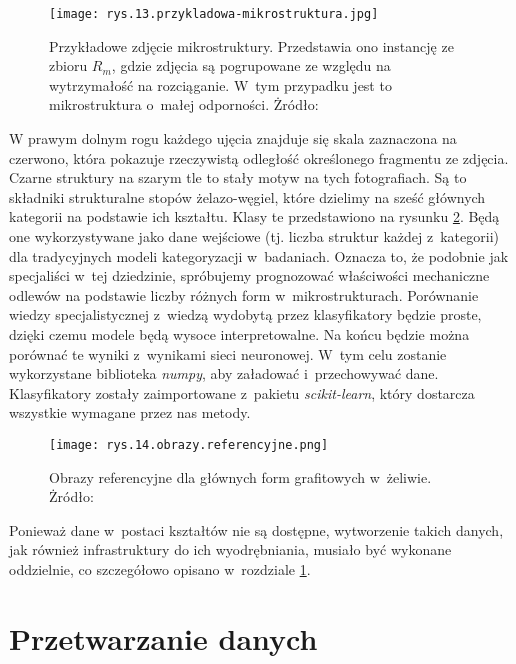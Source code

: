\begin{figure}[h]
    \centering
    \texttt{[image: rys.13.przykladowa-mikrostruktura.jpg]}
    \caption{Przykładowe zdjęcie mikrostruktury. Przedstawia ono instancję ze zbioru $R_m$, gdzie zdjęcia są pogrupowane ze względu na wytrzymałość na rozciąganie. W~tym przypadku jest to mikrostruktura o~małej odporności. Żródło: \cite{Pirowski17}}
    \label{fig:mesh13}
\end{figure}
W prawym dolnym rogu każdego ujęcia znajduje się skala zaznaczona na czerwono, która pokazuje rzeczywistą odległość określonego fragmentu ze zdjęcia. Czarne struktury na szarym tle to stały motyw na tych fotografiach. Są to składniki strukturalne stopów żelazo-węgiel, które dzielimy na sześć głównych kategorii na podstawie ich kształtu. Klasy te przedstawiono na rysunku \ref{fig:mesh14}. Będą one wykorzystywane jako dane wejściowe (tj. liczba struktur każdej z~kategorii) dla tradycyjnych modeli kategoryzacji w~badaniach. Oznacza to, że podobnie jak specjaliści w~tej dziedzinie, spróbujemy prognozować właściwości mechaniczne odlewów na podstawie liczby różnych form w~mikrostrukturach. Porównanie wiedzy specjalistycznej z~wiedzą wydobytą przez klasyfikatory będzie proste, dzięki czemu modele będą wysoce interpretowalne. Na końcu będzie można porównać te wyniki z~wynikami sieci neuronowej. W~tym celu zostanie wykorzystane biblioteka \textit{numpy}, aby załadować i~przechowywać dane. Klasyfikatory zostały zaimportowane z~pakietu \textit{scikit-learn}, który dostarcza wszystkie wymagane przez nas metody. 
\begin{figure}[h]
    \centering
    \texttt{[image: rys.14.obrazy.referencyjne.png]}
    \caption{Obrazy referencyjne dla głównych form grafitowych w~żeliwie. Żródło: \cite{norma}}
    \label{fig:mesh14}
\end{figure}
Ponieważ dane w~postaci kształtów nie są dostępne, wytworzenie takich danych, jak również infrastruktury do ich wyodrębniania, musiało być wykonane oddzielnie, co szczegółowo opisano w~rozdziale \ref{sec:przygotowanie_danych}.

\section{Przetwarzanie danych}
\label{sec:przygotowanie_danych}

